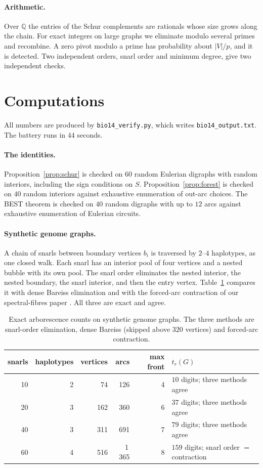 \documentclass[11pt]{article}
\theoremstyle{plain}
\theoremstyle{definition}
\theoremstyle{remark}
\begin{document}
\paragraph{Arithmetic.} Over $\mathbb Q$ the entries of the Schur complements are rationals whose size
grows along the chain. For exact integers on large graphs we eliminate modulo several primes and
recombine. A zero pivot modulo a prime has probability about $|V|/p$, and it is detected. Two
independent orders, snarl order and minimum degree, give two independent checks.

\section{Computations}\label{sec:comp}

All numbers are produced by \texttt{bio14\_verify.py}, which writes \texttt{bio14\_output.txt}. The
battery runs in $44$ seconds.

\paragraph{The identities.} Proposition~\ref{prop:schur} is checked on $60$ random Eulerian digraphs
with random interiors, including the sign conditions on $S$. Proposition~\ref{prop:forest} is checked on
$40$ random interiors against exhaustive enumeration of out-arc choices. The BEST theorem is checked on
$40$ random digraphs with up to $12$ arcs against exhaustive enumeration of Eulerian circuits.

\paragraph{Synthetic genome graphs.} A chain of snarls between boundary vertices $b_i$ is traversed by
$2$--$4$ haplotypes, as one closed walk. Each snarl has an interior pool of four vertices and a nested
bubble with its own pool. The snarl order eliminates the nested interior, the nested boundary, the
snarl interior, and then the entry vertex. Table~\ref{tab:syn} compares it with dense Bareiss
elimination and with the forced-arc contraction of our spectral-fibres paper \cite{CC26}. All three are
exact and agree.

\begin{table}[t]
\centering\small
\begin{tabular}{rrrrrl}
\toprule
snarls & haplotypes & vertices & arcs & max front & $t_r(G)$\\
\midrule
10 & 2 & 74 & 126 & 4 & $10$ digits; three methods agree\\
20 & 3 & 162 & 360 & 6 & $37$ digits; three methods agree\\
40 & 3 & 311 & 691 & 7 & $79$ digits; three methods agree\\
60 & 4 & 516 & 1\,365 & 8 & $159$ digits; snarl order $=$ contraction\\
\bottomrule
\end{tabular}
\caption{Exact arborescence counts on synthetic genome graphs. The three methods are snarl-order
elimination, dense Bareiss (skipped above $320$ vertices) and forced-arc contraction.}\label{tab:syn}
\end{table}
\end{document}
